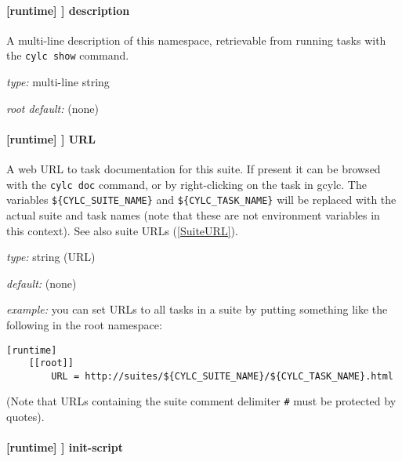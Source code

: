 \paragraph[description]{[runtime] \textrightarrow [[\_\_NAME\_\_]] \textrightarrow description}

A multi-line description of this namespace, retrievable from running tasks with the
\lstinline=cylc show= command.

\begin{myitemize}
\item {\em type:} multi-line string
\item {\em root default:} (none)
\end{myitemize}

\paragraph[URL]{[runtime] \textrightarrow [[\_\_NAME\_\_]] \textrightarrow URL}
\label{TaskURL}

A web URL to task documentation for this suite.  If present it can be browsed
with the \lstinline=cylc doc= command, or by right-clicking on the task in
gcylc.  The variables \lstinline=${CYLC_SUITE_NAME}= and
\lstinline=${CYLC_TASK_NAME}= will be replaced with the actual suite and task
names (note that these are not environment variables in this context). See also
suite URLs (\ref{SuiteURL}).

\begin{myitemize}
\item {\em type:} string (URL)
\item {\em default:} (none)
\item {\em example:} you can set URLs to all tasks in a suite by putting
    something like the following in the root namespace:
    \begin{lstlisting}
[runtime]
    [[root]]
        URL = http://suites/${CYLC_SUITE_NAME}/${CYLC_TASK_NAME}.html
    \end{lstlisting}
\end{myitemize}

(Note that URLs containing the suite comment delimiter
\lstinline=#= must be protected by quotes).

\paragraph[init-script]{[runtime] \textrightarrow [[\_\_NAME\_\_]] \textrightarrow init-script}

